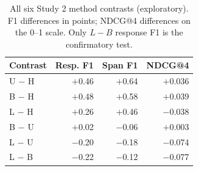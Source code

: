 \begin{table}[htbp]\centering\small
\caption{All six Study 2 method contrasts (exploratory). F1 differences in points; NDCG@4 differences on the 0--1 scale. Only $L-B$ response F1 is the confirmatory test.}\label{tab:pairwise}
\begin{tabular}{lrrr}\toprule
Contrast & Resp. F1 & Span F1 & NDCG@4\\\midrule
U $-$ H & $+$0.46 & $+$0.64 & $+$0.036\\
B $-$ H & $+$0.48 & $+$0.58 & $+$0.039\\
L $-$ H & $+$0.26 & $+$0.46 & $-$0.038\\
B $-$ U & $+$0.02 & $-$0.06 & $+$0.003\\
L $-$ U & $-$0.20 & $-$0.18 & $-$0.074\\
L $-$ B & $-$0.22 & $-$0.12 & $-$0.077\\
\bottomrule\end{tabular}\end{table}
